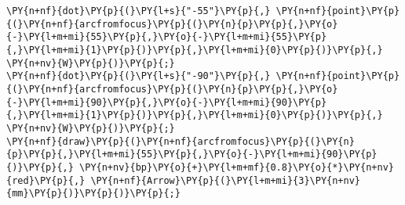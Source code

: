 \begin{Verbatim}[commandchars=\\\{\}]
\PY{n+nf}{dot}\PY{p}{(}\PY{l+s}{"-55"}\PY{p}{,} \PY{n+nf}{point}\PY{p}{(}\PY{n+nf}{arcfromfocus}\PY{p}{(}\PY{n}{p}\PY{p}{,}\PY{o}{-}\PY{l+m+mi}{55}\PY{p}{,}\PY{o}{-}\PY{l+m+mi}{55}\PY{p}{,}\PY{l+m+mi}{1}\PY{p}{)}\PY{p}{,}\PY{l+m+mi}{0}\PY{p}{)}\PY{p}{,} \PY{n+nv}{W}\PY{p}{)}\PY{p}{;}
\PY{n+nf}{dot}\PY{p}{(}\PY{l+s}{"-90"}\PY{p}{,} \PY{n+nf}{point}\PY{p}{(}\PY{n+nf}{arcfromfocus}\PY{p}{(}\PY{n}{p}\PY{p}{,}\PY{o}{-}\PY{l+m+mi}{90}\PY{p}{,}\PY{o}{-}\PY{l+m+mi}{90}\PY{p}{,}\PY{l+m+mi}{1}\PY{p}{)}\PY{p}{,}\PY{l+m+mi}{0}\PY{p}{)}\PY{p}{,} \PY{n+nv}{W}\PY{p}{)}\PY{p}{;}
\PY{n+nf}{draw}\PY{p}{(}\PY{n+nf}{arcfromfocus}\PY{p}{(}\PY{n}{p}\PY{p}{,}\PY{l+m+mi}{55}\PY{p}{,}\PY{o}{-}\PY{l+m+mi}{90}\PY{p}{)}\PY{p}{,} \PY{n+nv}{bp}\PY{o}{+}\PY{l+m+mf}{0.8}\PY{o}{*}\PY{n+nv}{red}\PY{p}{,} \PY{n+nf}{Arrow}\PY{p}{(}\PY{l+m+mi}{3}\PY{n+nv}{mm}\PY{p}{)}\PY{p}{)}\PY{p}{;}
\end{Verbatim}
